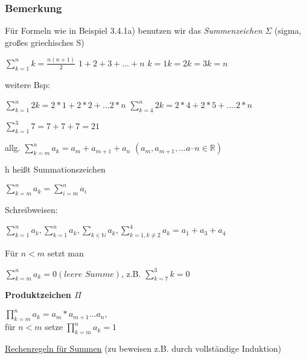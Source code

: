 \documentclass[a4paper, 12pt, twoside] {article}
\begin{document}
\subsubsection{Bemerkung}
Für Formeln wie in Beispiel 3.4.1a) benutzen wir das \textit{Summenzeichen} $\Sigma$ (sigma, großes griechisches S)

$\displaystyle\sum_{k = 1}^{n} k = \frac{n(n+1)}{2}$
$1 + 2 + 3 + ... +n$
$k = 1 k = 2 k = 3 k = n$ %

weitere Bsp:

$\sum_{k = 1}^{n} 2k = 2*1 + 2*2 + ... 2*n$
$\sum_{k=4}^{n} 2k = 2*4 + 2*5 + .... 2*n$

$\sum_{k=1}^{3} 7 = 7 + 7 + 7 = 21$ %

allg. $\sum_{k=m}^{n} a_k = a_m + a_{m+1} + a_n$
$(a_m, a_{m+1}, ... a–n \in \mathbb{R})$

h heißt Summationszeichen

$\sum_{k=m}^{n} a_k = \sum_{i = m}^{n} a_i$

Schreibweisen:

$\displaystyle\sum_{k = 1}^{n} a_k, \sum_{k = 1}^{n} a_k, \sum_{k \in \mathbb{N}} a_k, \sum_{k=1, k \neq 2}^{4} a_k = a_1 + a_3 + a_4$

Für $n < m$ setzt man

$\sum_{k=m}^{n} a_k = 0 (\textit{leere Summe})$, z.B. $\sum_{k=7}^{3} k = 0$

\vfill
\textbf{Produktzeichen $\Pi$}

$\displaystyle\prod_{k=m}^{n} a_k = a_m * a_{m+1} ... a_n,$ \\
für $n < m$ setze $\displaystyle\prod_{k=m}^{n} a_k = 1$

\underline{Rechenregeln für Summen} (zu beweisen z.B. durch vollständige Induktion)
\end{document}
